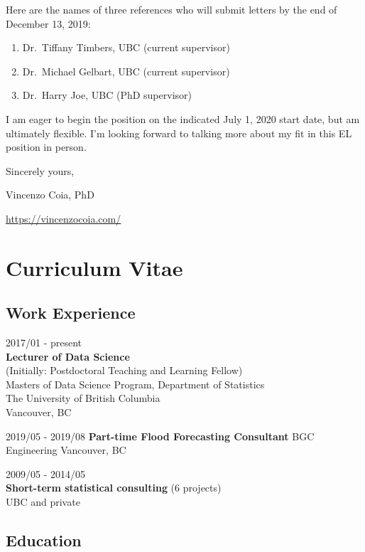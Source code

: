 \documentclass[]{article}
\providecommand{\tightlist}{%
  \setlength{\itemsep}{0pt}\setlength{\parskip}{0pt}}
\begin{document}
Here are the names of three references who will submit letters by the end of December 13, 2019:

\begin{enumerate}
\def\labelenumi{\arabic{enumi}.}
\tightlist
\item
  Dr.~Tiffany Timbers, UBC (current supervisor)
\item
  Dr.~Michael Gelbart, UBC (current supervisor)
\item
  Dr.~Harry Joe, UBC (PhD supervisor)
\end{enumerate}

I am eager to begin the position on the indicated July 1, 2020 start date, but am ultimately flexible. I'm looking forward to talking more about my fit in this EL position in person.

Sincerely yours,

Vincenzo Coia, PhD

\url{https://vincenzocoia.com/}

\hypertarget{curriculum-vitae}{%
\section{Curriculum Vitae}\label{curriculum-vitae}}

\hypertarget{work-experience}{%
\subsection{Work Experience}\label{work-experience}}

2017/01 - present\\
\textbf{Lecturer of Data Science}\\
(Initially: Postdoctoral Teaching and Learning Fellow)\\
Masters of Data Science Program, Department of Statistics\\
The University of British Columbia\\
Vancouver, BC

2019/05 - 2019/08
\textbf{Part-time Flood Forecasting Consultant}
BGC Engineering
Vancouver, BC

2009/05 - 2014/05\\
\textbf{Short-term statistical consulting} (6 projects)\\
UBC and private

\hypertarget{education}{%
\subsection{Education}\label{education}}
\end{document}

